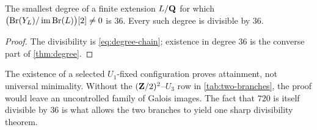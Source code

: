 \begin{corollary}
\label{cor:sharp-threshold}
The smallest degree of a finite extension \(L/\mathbf Q\) for which
\(\bigl(\operatorname{Br}(Y_{L})/\operatorname{im}\operatorname{Br}(L)\bigr)[2]\ne0\) is \(36\).  Every such degree is divisible by \(36\).
\end{corollary}

\begin{proof}
The divisibility is \cref{eq:degree-chain}; existence in degree \(36\) is the
converse part of \cref{thm:degree}.
\end{proof}

\begin{remark}
The existence of a selected \(U_1\)-fixed configuration proves attainment,
not universal minimality.  Without the \((\mathbf Z/2)^2\)--\(U_3\) row in
\cref{tab:two-branches}, the proof would leave an uncontrolled family of
Galois images.  The fact that \(720\) is itself divisible by \(36\) is what
allows the two branches to yield one sharp divisibility theorem.
\end{remark}

